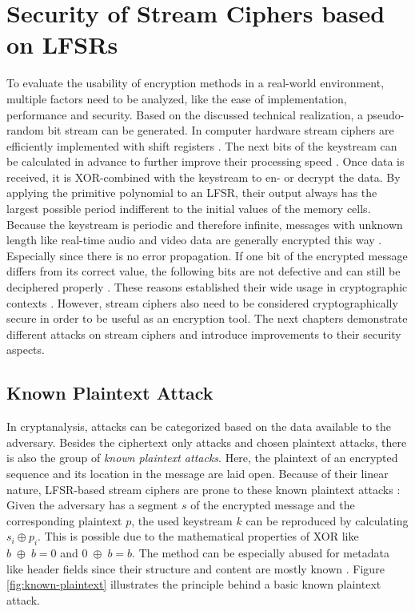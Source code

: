 \section{Security of Stream Ciphers based on LFSRs}

To evaluate the usability of encryption methods in a real-world environment, multiple factors need to be analyzed, like the ease of implementation, performance and security. Based on the discussed technical realization, a pseudo-random bit stream can be generated. In computer hardware stream ciphers are efficiently implemented with shift registers \cite{Stamp.2007}. The next bits of the keystream can be calculated in advance to further improve their processing speed \cite[p. 3]{Robshaw.1995}. Once data is received, it is XOR-combined with the keystream to en- or decrypt the data. By applying the primitive polynomial to an LFSR, their output always has the largest possible period indifferent to the initial values of the memory cells. Because the keystream is periodic and therefore infinite, messages with unknown length like real-time audio and video data are generally encrypted this way \cite[p. 181]{Smart.2016}. Especially since there is no error propagation. If one bit of the encrypted message differs from its correct value, the following bits are not defective and can still be deciphered properly \cite[p. 181]{Smart.2016}. These reasons established their wide usage in cryptographic contexts \cite[p. 97]{Pommerening.2000}. However, stream ciphers also need to be considered cryptographically secure in order to be useful as an encryption tool. The next chapters demonstrate different attacks on stream ciphers and introduce improvements to their security aspects.


\subsection{Known Plaintext Attack}

In cryptanalysis, attacks can be categorized based on the data available to the adversary. Besides the ciphertext only attacks and chosen plaintext attacks, there is also the group of \emph{known plaintext attacks}. Here, the plaintext of an encrypted sequence and its location in the message are laid open. \cite[p. 2-3]{Stamp.2007} Because of their linear nature, LFSR-based stream ciphers are prone to these known plaintext attacks \cite[p. 233]{Smart.2016}: Given the adversary has a segment $s$ of the encrypted message and the corresponding plaintext $p$, the used keystream $k$ can be reproduced by calculating $s_i \oplus p_i$. This is possible due to the mathematical properties of XOR like $b\;\oplus\;b = 0$ \space and \space $0\;\oplus\;b = b$. The method can be especially abused for metadata like header fields since their structure and content are mostly known \cite[p. 359]{Eckert.2018}. Figure \ref{fig:known-plaintext} illustrates the principle behind a basic known plaintext attack. \\

